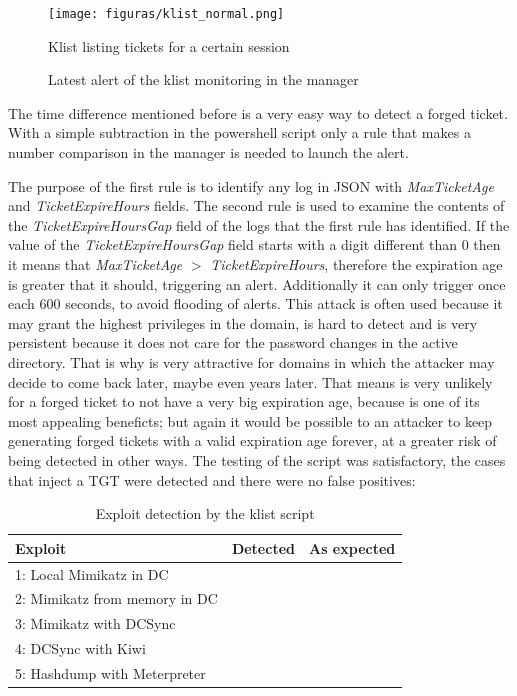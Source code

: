 \begin{figure}[H]
	\centering
	\texttt{[image: figuras/klist\_normal.png]}
	\caption{Klist listing tickets for a certain session}
\end{figure}
\begin{figure}[H]
	\centering
	\caption{Latest alert of the klist monitoring in the manager}
\end{figure}
\linej
The time difference mentioned before is a very easy way to detect a forged ticket. With a simple subtraction in the powershell script only a rule that makes a number comparison in the manager is needed to launch the alert.
\linej

\linej
The purpose of the first rule is to identify any log in JSON with \textit{MaxTicketAge} and \textit{TicketExpireHours} fields. The second rule is used to examine the contents of the \textit{TicketExpireHoursGap} field of the logs that the first rule has identified. If the value of the \textit{TicketExpireHoursGap} field starts with a digit different than 0 then it means that \textit{MaxTicketAge} $>$ \textit{TicketExpireHours}, therefore the expiration age is greater that it should, triggering an alert.
Additionally it can only trigger once each 600 seconds, to avoid flooding of alerts.
\linej
\linej
This attack is often used because it may grant the highest privileges in the domain, is hard to detect and is very persistent because it does not care for the password changes in the active directory. That is why is very attractive for domains in which the attacker may decide to come back later, maybe even years later. That means is very unlikely for a forged ticket to not have a very big expiration age, because is one of its most appealing beneficts; but again it would be possible to an attacker to keep generating forged tickets with a valid expiration age forever, at a greater risk of being detected in other ways.
\linej
\linej
The testing of the script was satisfactory, the cases that inject a TGT were detected and there were no false positives:
\begin{table}[H]
	\centering
	\begin{tabular}{|l|l|l|}
		\hline
		\rowcolor{gray!30}
		Exploit & Detected & As expected \\ \hline
		1: Local Mimikatz in DC& \RYES& \RYES\\ \hline
		2: Mimikatz from memory in DC& \RYES& \RYES\\ \hline
		3: Mimikatz with DCSync& \RYES& \RYES\\ \hline
		4: DCSync with Kiwi& \RNO& \RYES\\ \hline
		5: Hashdump with Meterpreter& \RNO& \RYES\\ \hline
	\end{tabular}
	\caption{Exploit detection by the klist script}
\end{table}
